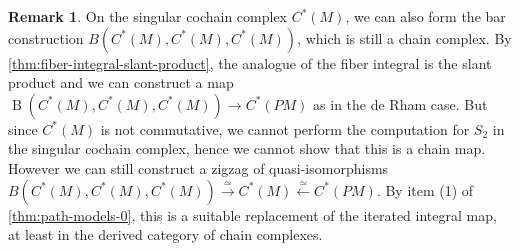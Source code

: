\documentclass{scrartcl}
\let\emph\relax
\theoremstyle{plain}
\theoremstyle{definition}
\newtheorem{definition}[theorem]{Definition}
\newtheorem{remark}[theorem]{Remark}
\newcommand{\slant}{\mathbin{/}}
\newcommand{\quiso}{\simeq}
\let\xto\xrightarrow
\let\xfrom\xleftarrow
\DeclareMathOperator{\BC}{B}
\newcommand{\blank}{-}
\newcommand{\comp}{\mathbin{\circ}}
\begin{document}
\begin{remark}
    On the singular cochain complex $C^*(M)$, we can also form the bar construction $B(C^*(M), C^*(M), C^*(M))$, which is still a chain complex. By \cref{thm:fiber-integral-slant-product}, the analogue of the fiber integral is the slant product and we can construct a map $\BC(C^*(M), C^*(M), C^*(M)) \to C^*(PM)$ as in the de Rham case. But since $C^*(M)$ is not commutative, we cannot perform the computation for $S_2$ in the singular cochain complex, hence we cannot show that this is a chain map. However we can still construct a zigzag of quasi-isomorphisms $B(C^*(M), C^*(M), C^*(M)) \xto{\quiso} C^*(M) \xfrom{\quiso} C^*(PM)$. By item (1) of \cref{thm:path-models-0}, this is a suitable replacement of the iterated integral map, at least in the derived category of chain complexes.
\end{remark}

\end{document}
